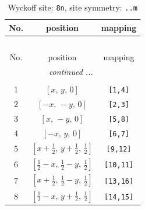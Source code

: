 \documentclass[fleqn,8pt]{jsarticle}
\begin{document}
\begin{longtable}{ccc}
\caption{Wyckoff site: {\tt 8n}, site symmetry: {\tt ..m}}
 \\
 \hline \hline
No. & position & mapping \\ \hline \endfirsthead

\multicolumn{2}{l}{\tablename\ \thetable{}} \\
 \hline \hline
No. & position & mapping \\ \hline \endhead

 \hline \hline
\multicolumn{2}{r}{\footnotesize\it continued ...} \\ \endfoot

 \hline \hline
\multicolumn{2}{r}{} \\ \endlastfoot

1 & $\left[ x,\, y,\, 0 \right]$ & {\tt [1,4]} \\ \hline
2 & $\left[ - x,\, - y,\, 0 \right]$ & {\tt [2,3]} \\ \hline
3 & $\left[ x,\, - y,\, 0 \right]$ & {\tt [5,8]} \\ \hline
4 & $\left[ - x,\, y,\, 0 \right]$ & {\tt [6,7]} \\ \hline
5 & $\left[ x + \frac{1}{2},\, y + \frac{1}{2},\, \frac{1}{2} \right]$ & {\tt [9,12]} \\ \hline
6 & $\left[ \frac{1}{2} - x,\, \frac{1}{2} - y,\, \frac{1}{2} \right]$ & {\tt [10,11]} \\ \hline
7 & $\left[ x + \frac{1}{2},\, \frac{1}{2} - y,\, \frac{1}{2} \right]$ & {\tt [13,16]} \\ \hline
8 & $\left[ \frac{1}{2} - x,\, y + \frac{1}{2},\, \frac{1}{2} \right]$ & {\tt [14,15]} \\
\end{longtable}
\renewcommand{\arraystretch}{1.2}
\end{document}
